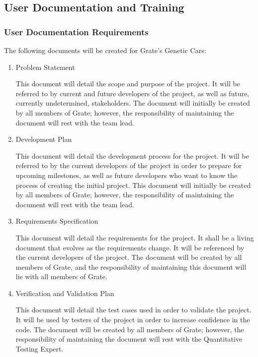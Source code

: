 \documentclass[12pt, titlepage]{article}
\begin{document}
\subsection{User Documentation and Training}

\subsubsection{User Documentation Requirements}
The following documents will be created for Grate's Genetic Cars:

\begin{enumerate}

\item{Problem Statement}

This document will detail the scope and purpose of the project. It will be 
referred to by current and future developers of the project, as well as future, 
currently undetermined, stakeholders. The document will initially be created by 
all members of Grate; however, the responsibility of maintaining the document 
will rest with the team lead.

\item{Development Plan}

This document will detail the development process for the project. It will be 
referred to by the current developers of the project in order to prepare for 
upcoming milestones, as well as future developers who want to know the process 
of creating the initial project. This document will initially be created by all 
members of Grate; however, the responsibility of maintaining the document will 
rest with the team lead.

\item{Requirements Specification}

This document will detail the requirements for the project. It shall be a living 
document that evolves as the requirements change. It will be referenced by the 
current developers of the project. The document will be created by all members 
of Grate, and the responsibility of maintaining this document will lie with all 
members of Grate. 

\item{Verification and Validation Plan}

This document will detail the test cases used in order to validate the project. 
It will be used by testers of the project in order to increase confidence in the 
code. The document will be created by all members of Grate; however, the 
responsibility of maintaining the document will rest with the Quantitative 
Testing Expert.


\end{enumerate}
\end{document}
